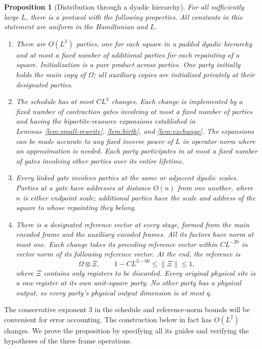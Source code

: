 \documentclass[11pt]{article}
\numberwithin{equation}{section}
\newtheorem{proposition}[theorem]{Proposition}
\theoremstyle{definition}
\theoremstyle{remark}
\begin{document}
\begin{proposition}[Distribution through a dyadic hierarchy]
\label{prop:protocol}
For all sufficiently large $L$, there is a protocol with the following
properties.  All constants in this statement are uniform in the
Hamiltonian and $L$.
\begin{enumerate}
\item
There are $O(L^2)$ parties, one for each square in a padded dyadic
hierarchy and at most a fixed number of additional parties for each
repainting of a square.  Initialization is a pure product across
parties.  One party initially holds the main copy of $\Omega$; all
auxiliary copies are initialized privately at their designated parties.
\item
The schedule has at most $C L^3$ changes.  Each change is implemented by
a fixed number of contraction gates involving at most a fixed number of
parties and having the bipartite-resource expansions established in
Lemmas~\ref{lem:small-rewrite}, \ref{lem:birth}, and
\ref{lem:exchange}.  The expansions can be made accurate to any fixed
inverse power of $L$ in operator norm where an approximation is needed.
Each party participates in at most a fixed number of gates involving
other parties over its entire lifetime.
\item
Every linked gate involves parties at the same or adjacent dyadic
scales.  Parties at a gate have addresses at distance $O(n)$ from one
another, where $n$ is either endpoint scale; additional parties have the
scale and address of the square to whose repainting they belong.
\item
There is a designated reference vector at every stage, formed from the
main encoded frame and the auxiliary encoded frames.  All its factors
have norm at most one.  Each change takes its preceding reference vector
within $C L^{-20}$ in vector norm of its following reference vector.
At the end, the reference is
\[
 \Omega\otimes\Xi,
 \qquad 1-C L^{3-60}\le \lVert \Xi\rVert\le1,
\]
where $\Xi$ contains only registers to be discarded.  Every original
physical site is a raw register at its own unit-square party.  No other
party has a physical output, so every party's physical output dimension
is at most $q$.
\end{enumerate}
\end{proposition}

The conservative exponent $3$ in the schedule and reference-norm bounds
will be convenient for error accounting.  The construction below in fact
has $O(L^2)$ changes.  We prove the proposition by specifying all its
guides and verifying the hypotheses of the three frame operations.
\end{document}
